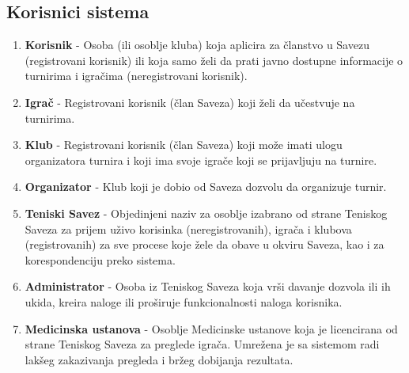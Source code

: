 \documentclass{article}
\begin{document}
\subsection{Korisnici sistema}
\begin{enumerate}
        \item \textbf{Korisnik} - Osoba (ili osoblje kluba) koja aplicira za članstvo u Savezu (registrovani korisnik) ili koja samo želi da prati javno dostupne informacije o turnirima i igračima (neregistrovani korisnik).
        \item \textbf{Igrač} - Registrovani korisnik (član Saveza) koji želi da učestvuje na turnirima.
        \item \textbf{Klub} - Registrovani korisnik (član Saveza) koji može imati ulogu organizatora turnira i koji ima svoje igrače koji se prijavljuju na turnire. 
        \item \textbf{Organizator} - Klub koji je dobio od Saveza dozvolu da organizuje turnir.
        \item \textbf{Teniski Savez} - Objedinjeni naziv za osoblje izabrano od strane Teniskog Saveza za prijem uživo korisinka (neregistrovanih), igrača i klubova (registrovanih) za sve procese koje žele da obave u okviru Saveza, kao i za korespondenciju preko sistema.
        \item \textbf{Administrator} - Osoba iz Teniskog Saveza koja vrši davanje dozvola ili ih ukida, kreira naloge ili proširuje funkcionalnosti naloga korisnika.
        \item \textbf{Medicinska ustanova} - Osoblje Medicinske ustanove koja je licencirana od strane Teniskog Saveza za preglede igrača. Umrežena je sa sistemom radi lakšeg zakazivanja pregleda i bržeg dobijanja rezultata.

    \end{enumerate}
    
\end{document}
